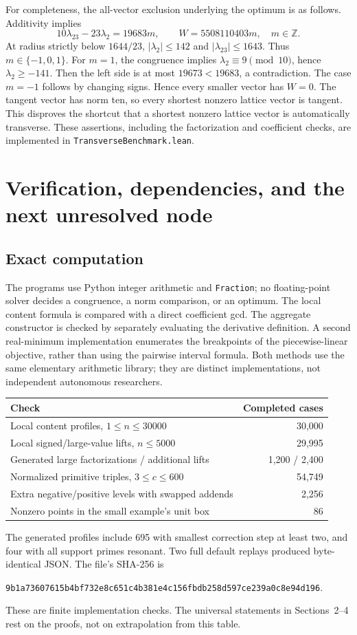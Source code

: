 \documentclass[11pt]{article}
\theoremstyle{definition}
\theoremstyle{remark}
\newcommand{\Z}{\mathbb Z}
\begin{document}
For completeness, the all-vector exclusion underlying the optimum is as follows. Additivity implies
\[
 10\lambda_{23}-23\lambda_2=19683m,
 \qquad W=5508110403m,\quad m\in\Z.
\]
At radius strictly below $1644/23$, $|\lambda_2|\le142$ and $|\lambda_{23}|\le1643$. Thus $m\in\{-1,0,1\}$. For $m=1$, the congruence implies $\lambda_2\equiv9\pmod{10}$, hence $\lambda_2\ge-141$. Then the left side is at most $19673<19683$, a contradiction. The case $m=-1$ follows by changing signs. Hence every smaller vector has $W=0$. The tangent vector has norm ten, so every shortest nonzero lattice vector is tangent. This disproves the shortcut that a shortest nonzero lattice vector is automatically transverse. These assertions, including the factorization and coefficient checks, are implemented in \texttt{TransverseBenchmark.lean}.

\section{Verification, dependencies, and the next unresolved node}\label{sec:audit}
\subsection{Exact computation}
The programs use Python integer arithmetic and \texttt{Fraction}; no floating-point solver decides a congruence, a norm comparison, or an optimum. The local content formula is compared with a direct coefficient gcd. The aggregate constructor is checked by separately evaluating the derivative definition. A second real-minimum implementation enumerates the breakpoints of the piecewise-linear objective, rather than using the pairwise interval formula. Both methods use the same elementary arithmetic library; they are distinct implementations, not independent autonomous researchers.

\begin{center}
\begin{tabular}{lr}
\toprule
Check & Completed cases\\
\midrule
Local content profiles, $1\le n\le30000$ & 30,000\\
Local signed/large-value lifts, $n\le5000$ & 29,995\\
Generated large factorizations / additional lifts & 1,200 / 2,400\\
Normalized primitive triples, $3\le c\le600$ & 54,749\\
Extra negative/positive levels with swapped addends & 2,256\\
Nonzero points in the small example's unit box & 86\\
\bottomrule
\end{tabular}
\end{center}
The generated profiles include 695 with smallest correction step at least two, and four with all support primes resonant. Two full default replays produced byte-identical JSON. The file's SHA-256 is
\begin{center}\small\texttt{9b1a73607615b4bf732e8c651c4b381e4c156fbdb258d597ce239a0c8e94d196}.\end{center}
These are finite implementation checks. The universal statements in Sections~2--4 rest on the proofs, not on extrapolation from this table.
\end{document}
